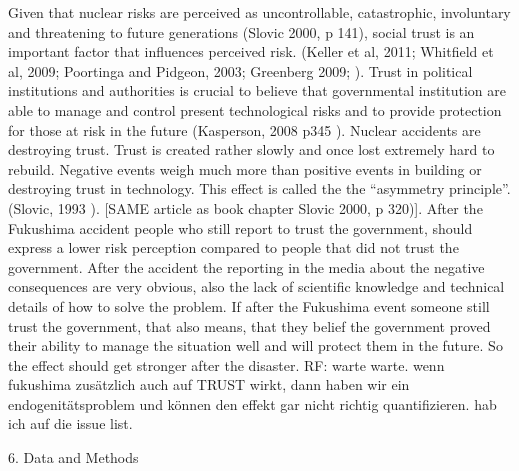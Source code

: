   
Given that nuclear risks are perceived as uncontrollable, catastrophic, involuntary and threatening to future generations (Slovic 2000, p 141),  social trust is an important factor that influences perceived risk. (Keller et al, 2011; Whitfield et al, 2009; Poortinga and Pidgeon, 2003; Greenberg 2009; \citep{Whitfield:2009ku,Poortinga:2003cb,Keller:2011gb, Greenberg:2009fx}). Trust in political institutions and authorities is crucial to believe that governmental institution are able to manage and control present technological risks and to provide protection for those at risk in the future (Kasperson, 2008 p345 \citep{Kasperson:2008tw}).  
Nuclear accidents are destroying trust. Trust is created rather slowly and once lost extremely hard to rebuild. Negative events weigh much more than positive events in building or destroying trust in technology. This effect is called the the ``asymmetry principle''. (Slovic, 1993 \citep{Slovic:1993gm}). [SAME article as book chapter Slovic 2000, p 320)].  
After the Fukushima accident people who still report to trust the government, should express a lower risk perception compared to people that did not trust the government. After the accident the reporting in the media about the negative consequences are very obvious, also the lack of scientific knowledge and technical details of how to solve the problem. If after the Fukushima event someone still trust the government, that also means, that they belief the government proved their ability to manage the situation well and will protect them in the future. So the effect should get stronger after the disaster.
RF: warte warte. wenn fukushima zusätzlich auch auf TRUST wirkt, dann haben wir ein endogenitätsproblem und können den effekt gar nicht richtig quantifizieren. hab ich auf die issue list.

    

6. Data and Methods 



